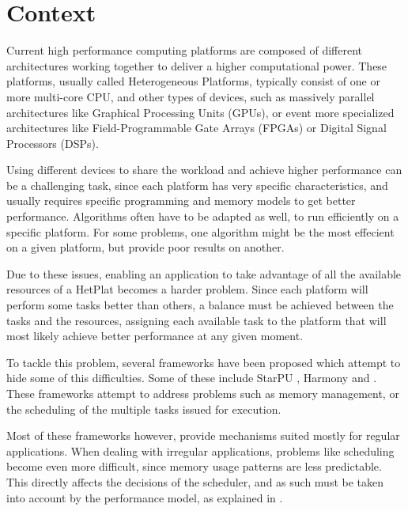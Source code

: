 \section{Context}

Current high performance computing platforms are composed of different architectures working together to deliver a higher computational power. These platforms, usually called Heterogeneous Platforms, typically consist of one or more multi-core CPU, and other types of devices, such as massively parallel architectures like Graphical Processing Units (GPUs), or event more specialized architectures like Field-Programmable Gate Arrays (FPGAs) or Digital Signal Processors (DSPs).

Using different devices to share the workload and achieve higher performance can be a challenging task, since each platform has very specific characteristics, and usually requires specific programming and memory models to get better performance. Algorithms often have to be adapted as well, to run efficiently on a specific platform. For some problems, one algorithm might be the most effecient on a given platform, but provide poor results on another.

Due to these issues, enabling an application to take advantage of all the available resources of a HetPlat becomes a harder problem. Since each platform will perform some tasks better than others, a balance must be achieved between the tasks and the resources, assigning each available task to the platform that will most likely achieve better performance at any given moment.

To tackle this problem, several frameworks have been proposed which  attempt to hide some of this difficulties. Some of these include StarPU \cite{augonnet2011starpu}, Harmony \cite{diamos2008harmony} and \GAMA \cite{joao2012gama}. These frameworks attempt to address problems such as memory management, or the scheduling of the multiple tasks issued for execution.

Most of these frameworks however, provide mechanisms suited mostly for regular applications. When dealing with irregular applications, problems like scheduling become even more difficult, since memory usage patterns are less predictable. This directly affects the decisions of the scheduler, and as such must be taken into account by the performance model, as explained in \cite{artur2012gama}.


